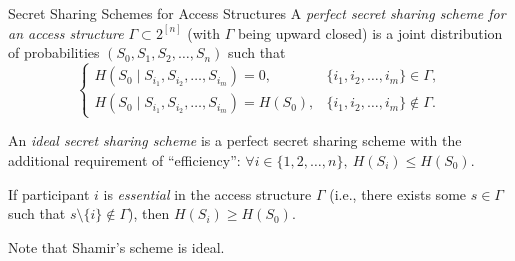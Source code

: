 \documentclass[aspectratio=169]{beamer}
\newcommand{\seqn}[2]{{#1}_1,{#1}_2,\dotsc,{#1}_{#2}}
\newcommand{\seqin}[3]{{#1}_{{#2}_1},{#1}_{{#2}_2},\dotsc,{#1}_{{#2}_{#3}}}
\begin{document}
\begin{frame}{Secret Sharing Schemes for Access Structures}
    A \emph{perfect secret sharing scheme for an access structure $\Gamma \subset 2^{[n]}$} (with $\Gamma$ being upward closed) is a joint distribution of probabilities $(S_0, \seqn{S}{n})$ such that
    \[
    \begin{cases}
        H(S_0 \mid \seqin{S}{i}{m}) = 0, & \{\seqn{i}{m}\} \in \Gamma,\\
        H(S_0 \mid \seqin{S}{i}{m}) = H(S_0), & \{\seqn{i}{m}\} \not\in \Gamma.
    \end{cases}
    \]

    An \emph{ideal secret sharing scheme} is a perfect secret sharing scheme with the additional requirement of ``efficiency'':
    $
    \forall i \in \{1, 2, \dotsc, n\},\ H(S_i) \le H(S_0).
    $

\begin{theorem}
    If participant $i$ is \emph{essential} in the access structure $\Gamma$ (i.e., there exists
    some $s \in \Gamma$ such that $s \setminus \{i\} \not\in \Gamma$), then $H(S_i) \ge H(S_0)$.
\end{theorem}

Note that Shamir's scheme is ideal.

\end{frame}
\end{document}

